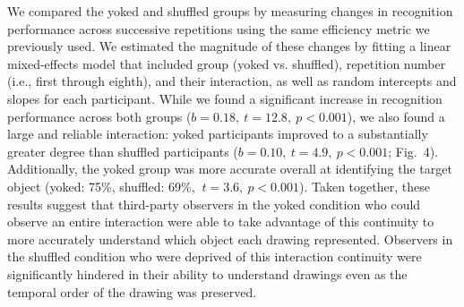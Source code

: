 \documentclass[10pt,letterpaper]{article}
\newcommand{\ndg}[1]{{\textcolor{Green}{[ndg: #1]}}}
\begin{document}
We compared the yoked and shuffled groups by measuring changes in recognition performance across successive repetitions using the same efficiency metric we previously used.
We estimated the magnitude of these changes by fitting a linear mixed-effects model that included group (yoked vs. shuffled), repetition number (i.e., first through eighth), and their interaction, as well as random intercepts and slopes for each participant.
While we found a significant increase in recognition performance across both groups ($b = 0.18, ~t = 12.8, ~p < 0.001$), %
we also found a large and reliable interaction:
yoked participants improved to a substantially greater degree than shuffled participants ($b = 0.10, ~t = 4.9, ~p<0.001$; Fig.~4).
Additionally, the yoked group was more accurate overall at identifying the target object (yoked: 75\%, shuffled: 69\%, $~t = 3.6, ~p < 0.001$). %
Taken together, these results suggest that third-party observers in the yoked condition who could observe an entire interaction were able to take advantage of this continuity to more accurately understand which object each drawing represented.
Observers in the shuffled condition who were deprived of this interaction continuity were significantly hindered in their ability to understand drawings even as the temporal order of the drawing was preserved.



\end{document}
